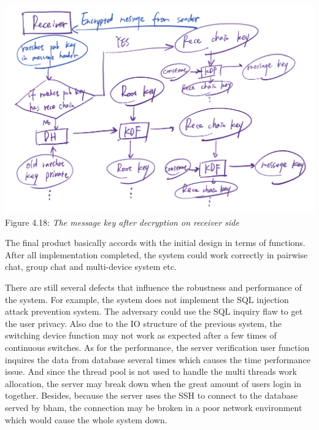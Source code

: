 \begin{center}
\includegraphics[scale=.5]{../3-Background/resources/DH-rece.png}\\
Figure 4.18: \textit{The message key after decryption on receiver side}
\end{center}

The final product basically accords with the initial design in terms of functions. After all implementation completed, the system could work correctly in pairwise chat, group chat and multi-device system etc.

There are still several defects that influence the robustness and performance of the system. For example, the system does not implement the SQL injection attack prevention system. The adversary could use the SQL inquiry flaw to get the user privacy. Also due to the IO structure of the previous system, the switching device function may not work as expected after a few times of continuous switches. As for the performance, the server verification user function inquires the data from database several times which causes the time performance issue. And since the thread pool is not used to handle the multi threads work allocation, the server may break down when the great amount of users login in together. Besides, because the server uses the SSH to connect to the database served by bham, the connection may be broken in a poor network environment which would cause the whole system down.

\clearpage
